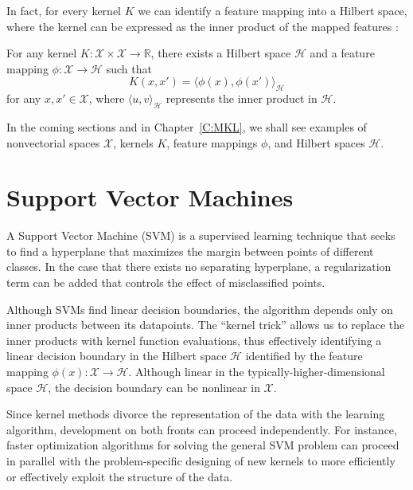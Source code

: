 In fact, for every kernel $K$ we can identify a feature mapping into a Hilbert
space, where the kernel can be expressed as the inner product of the mapped
features \cite{scholkopf2004kernel}:
\begin{theorem}
  For any kernel $K: \mathcal{X} \times \mathcal{X} \to \mathbb{R}$, there
  exists a Hilbert space $\mathcal{H}$ and a feature mapping
  $\phi: \mathcal{X} \to \mathcal{H}$ such that
  \begin{equation*}
    K(x, x') = \langle \phi(x), \phi(x') \rangle_{\mathcal{H}}
  \end{equation*}
  for any $x, x' \in \mathcal{X}$, where $\langle u, v \rangle_{\mathcal{H}}$
  represents the inner product in $\mathcal{H}$.
\end{theorem}

In the coming sections and in Chapter~\ref{C:MKL}, we shall see examples of
nonvectorial spaces $\mathcal{X}$, kernels $K$, feature mappings $\phi$, and
Hilbert spaces $\mathcal{H}$.

\section{Support Vector Machines}
A Support Vector Machine (SVM) \cite{cortes1995support} is a supervised learning
technique that seeks to find a hyperplane that maximizes the margin between
points of different classes.  In the case that there exists no separating
hyperplane, a regularization term can be added that controls the effect of
misclassified points.

Although SVMs find linear decision boundaries,
the algorithm depends only on inner products between its datapoints.  The
``kernel trick'' \cite{aizerman1964theoretical} allows us to replace the
inner products with kernel function evaluations, thus effectively identifying
a linear decision boundary in the Hilbert space $\mathcal{H}$ identified by
the feature mapping $\phi(x): \mathcal{X} \to \mathcal{H}$.  Although linear
in the typically-higher-dimensional space $\mathcal{H}$, the decision boundary
can be nonlinear in $\mathcal{X}$.

Since kernel methods divorce the representation of the data with the learning
algorithm, development on both fronts can proceed independently.  For instance,
faster optimization algorithms for solving the general SVM problem can proceed
in parallel with the problem-specific designing of new kernels to more efficiently
or effectively exploit the structure of the data.

